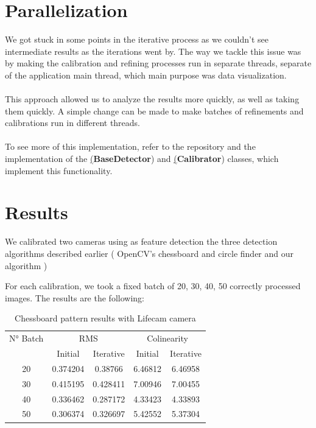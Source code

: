 \documentclass[journal]{IEEEtran}
\begin{document}
\section{Parallelization}

We got stuck in some points in the iterative process as we couldn't see intermediate results as the iterations went by. The way we tackle this issue was by making the calibration and refining processes run in separate threads, separate of the application main thread, which main purpose was data visualization.
\\
\\
This approach allowed us to analyze the results more quickly, as well as taking them quickly. A simple change can be made to make batches of refinements and calibrations run in different threads.
\\
\\
To see more of this implementation, refer to the repository and the implementation of the \href{https://github.com/wpumacay/calibcv/blob/dev/calibration/calibrationBaseDetector.cpp}(\textbf{BaseDetector}) and \href{https://github.com/wpumacay/calibcv/blob/dev/calibration/calibrationTool.h}(\textbf{Calibrator}) classes, which implement this functionality.

\section{Results}
We calibrated two cameras using as feature detection the three detection algorithms described earlier ( OpenCV's chessboard and circle finder and our algorithm )

For each calibration, we took a fixed batch of 20, 30, 40, 50 correctly processed images. The results are the following:

\begin{table}[h]
\centering
\caption{Chessboard pattern results with Lifecam camera}
\begin{tabular}{ |c||c|c|c|c|  }
 \hline
 N° Batch & \multicolumn{2}{c|}{RMS} & \multicolumn{2}{c|}{Colinearity}\\
 \cline{2-5}
 & Initial & Iterative & Initial & Iterative \\
 \hline
 20        & 0.374204 & 0.38766 & 6.46812 & 6.46958 \\
 30        & 0.415195 & 0.428411 & 7.00946 & 7.00455 \\
 40        & 0.336462 & 0.287172 & 4.33423 & 4.33893 \\
 50        & 0.306374 & 0.326697 & 5.42552 & 5.37304 \\
 \hline
\end{tabular}
\\
\end{table}
\end{document}
